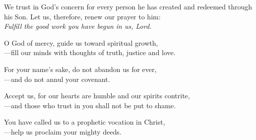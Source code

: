 \intercessions

\begin{raggedright}
We trust in God’s concern for every person he has created and redeemed through his Son. Let us, therefore, renew our prayer to him:\\
\emph{Fulfill the good work you have begun in us, Lord.}

\medskip
O God of mercy, guide us toward spiritual growth,\\
{\color{red}---}fill our minds with thoughts of truth, justice and love.

\medskip
For your name’s sake, do not abandon us for ever,\\
{\color{red}---}and do not annul your covenant.

\medskip
Accept us, for our hearts are humble and our spirits contrite,\\
{\color{red}---}and those who trust in you shall not be put to shame.

\medskip
You have called us to a prophetic vocation in Christ,\\
{\color{red}---}help us proclaim your mighty deeds.
\end{raggedright}